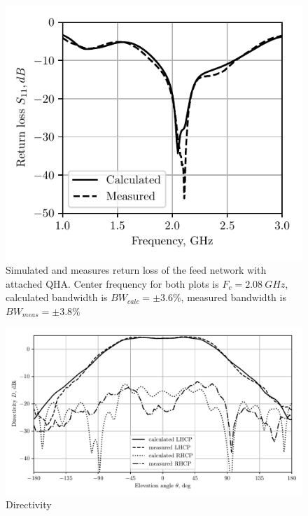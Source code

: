 \documentclass{IEEEtran}
\begin{document}
\begin{figure}
  \centerline{\includegraphics{images/Sparam}}
  \caption{Simulated and measures return loss of the feed network with
    attached QHA. Center frequency for both plots is $F_c = 2.08~GHz$,
    calculated bandwidth is $BW_{calc} = \pm 3.6 \%$, measured
    bandwidth is $BW_{meas} = \pm 3.8 \%$}
  \label{fig:sparam}
\end{figure}

\begin{figure}
  \centerline{\includegraphics{images/Directivity}}
  \caption{Directivity}
  \label{fig:directivity}
\end{figure}
\end{document}
